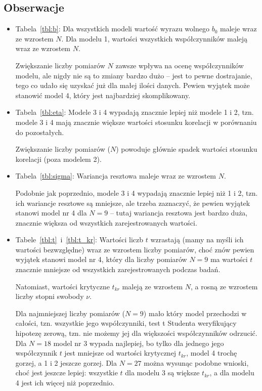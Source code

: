 \documentclass[11pt, a4paper]{article}
\begin{document}
\subsection{Obserwacje}
\begin{itemize}
\item Tabela~\ref{tbl:b}: Dla wszystkich modeli wartość wyrazu wolnego $b_0$ maleje wraz ze wzrostem $N$. Dla modelu 1, wartości wszystkich współczynników maleją wraz ze wzrostem $N$.

Zwiększanie liczby pomiarów $N$ zawsze wpływa na ocenę współczynników modelu, ale nigdy nie są to zmiany bardzo dużo -- jest to pewne dostrajanie, tego co udało się uzyskać już dla małej ilości danych. Pewien wyjątek może stanowić model 4, który jest najbardziej skomplikowany.
\item Tabela~\ref{tbl:eta}: Modele 3 i 4 wypadają znacznie lepiej niż modele 1 i 2, tzn. modele 3 i 4 mają znacznie większe wartości stosunku korelacji w porównaniu do pozostałych.

Zwiększanie liczby pomiarów ($N$) powoduje głównie spadek wartości stosunku korelacji (poza modelem 2).

\item Tabela~\ref{tbl:sigma}: Wariancja resztowa maleje wraz ze wzrostem $N$.

Podobnie jak poprzednio, modele 3 i 4 wypadają znacznie lepiej niż 1 i 2, tzn. ich wariancje resztowe są mniejsze, ale trzeba zaznaczyć, że pewien wyjątek stanowi model nr 4 dla $N = 9$ -- tutaj wariancja resztowa jest bardzo duża, znacznie większa od wszystkich zarejestrowanych wartości.

\item Tabele~\ref{tbl:t}~i~\ref{tbl:t_kr}: Wartości liczb $t$ wzrastają (mamy na myśli ich wartości bezwzględne) wraz ze wzrostem liczby pomiarów, choć znów pewien wyjątek stanowi model nr 4, który dla liczby pomiarów $N = 9$ ma wartości $t$ znacznie mniejsze od wszystkich zarejestrowanych podczas badań.

Natomiast, wartości krytyczne $t_{kr}$ maleją ze wzrostem $N$, a rosną ze wzrostem liczby stopni swobody $\nu$.

Dla najmniejszej liczby pomiarów ($N = 9$) mało który model przechodzi w całości, tzn. wszystkie jego współczynniki, test t Studenta weryfikujący hipotezę zerową, tzn. nie możemy jej dla większości współczynników odrzucić. Dla $N = 18$ model nr 3 wypada najlepiej, bo tylko dla jednego jego współczynnik $t$ jest mniejsze od wartości krytycznej $t_{kr}$, model 4 trochę gorzej, a 1 i 2 jeszcze gorzej. Dla $N = 27$ można wysunąc podobne wnioski, choć jest jeszcze lepiej: wszystkie $t$ dla modelu 3 są większe $t_{kr}$, a dla modelu 4 jest ich więcej niż poprzednio.


\end{itemize}
\end{document}
